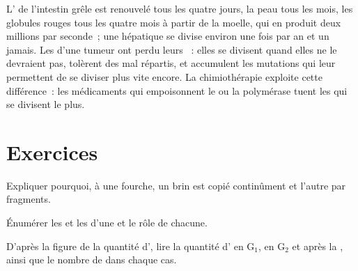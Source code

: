 \begin{example}[Le renouvellement]\label{ex:b1:replication-mitosis:turnover}
L' de l'intestin grêle est renouvelé tous les quatre jours, la
peau tous les mois, les globules rouges tous les quatre mois à partir de
la moelle, qui en produit deux millions par seconde~; une 
hépatique se divise environ une fois par an et un  jamais. Les
 d'une tumeur ont perdu leurs ~: elles se
divisent quand elles ne le devraient pas, tolèrent des  mal
répartis, et accumulent les mutations qui leur permettent de se diviser
plus vite encore. La chimiothérapie exploite cette différence~: les
médicaments qui empoisonnent le  ou la polymérase tuent les
 qui se divisent le plus.
\end{example}

\section{Exercices}

\begin{exercise}[$\star$]\label{exo:b1:replication-mitosis:1}
Expliquer pourquoi, à une fourche, un brin est copié continûment et
l'autre par fragments.
\end{exercise}

\begin{exercise}[$\star$]\label{exo:b1:replication-mitosis:2}
Énumérer les  et les  d'une  et le
rôle de chacune.
\end{exercise}

\begin{exercise}[$\star$]\label{exo:b1:replication-mitosis:3}
D'après la figure de la quantité d', lire la quantité d' en
G$_1$, en G$_2$ et après la , ainsi que le nombre de 
dans chaque cas.
\end{exercise}

